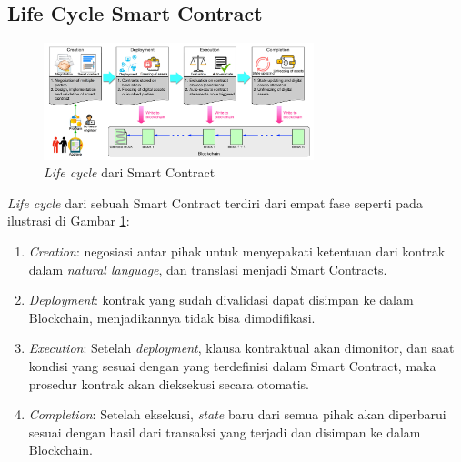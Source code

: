 \subsection{Life Cycle Smart Contract}
\label{subsec:lifecycle}

\begin{figure}[ht]
	\centering
	\includegraphics[width=0.7\textwidth]{resources/chapter-2/sc-lifecycle.png}
	\caption{\textit{Life cycle} dari Smart Contract \parencite{zheng2020overview}}
	\label{image:sc-lifecycle}
\end{figure}

\textit{Life cycle} dari sebuah Smart Contract terdiri dari empat fase seperti pada ilustrasi di Gambar \ref{image:sc-lifecycle}:

\begin{enumerate}
	\item \textit{Creation}: negosiasi antar pihak untuk menyepakati ketentuan dari kontrak dalam \textit{natural language}, dan translasi menjadi Smart Contracts.
	\item \textit{Deployment}: kontrak yang sudah divalidasi dapat disimpan ke dalam Blockchain, menjadikannya tidak bisa dimodifikasi.
	\item \textit{Execution}: Setelah \textit{deployment}, klausa kontraktual akan dimonitor, dan saat kondisi yang sesuai dengan yang terdefinisi dalam Smart Contract, maka prosedur kontrak akan dieksekusi secara otomatis.
	\item \textit{Completion}: Setelah eksekusi, \textit{state} baru dari semua pihak akan diperbarui sesuai dengan hasil dari transaksi yang terjadi dan disimpan ke dalam Blockchain.
\end{enumerate}